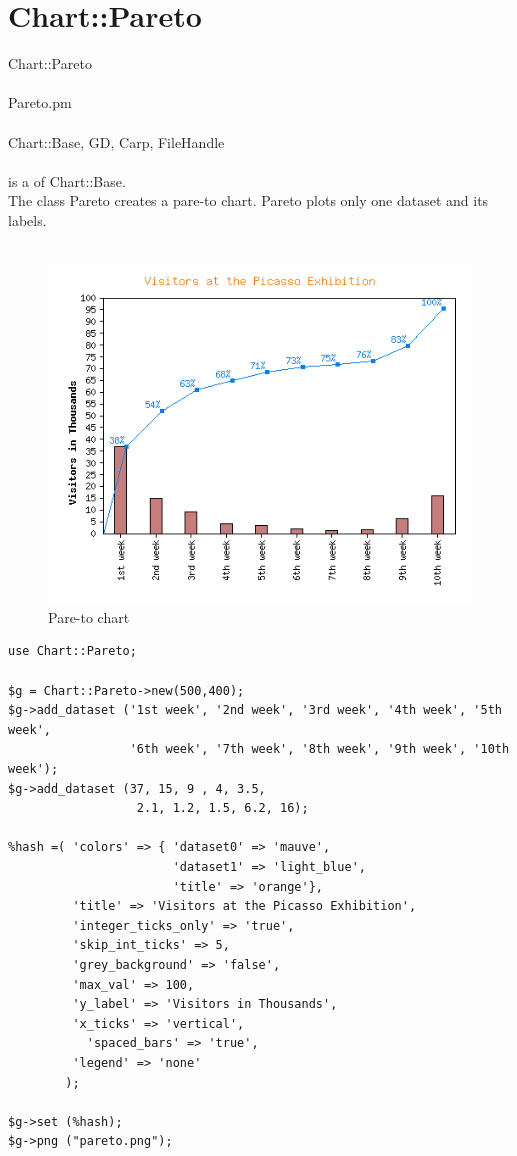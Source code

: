 \section{Chart::Pareto}
 Chart::Pareto\\ \\
 Pareto.pm\\ \\
Chart::Base, GD, Carp, FileHandle\\ \\
  is a  of Chart::Base.\\
The class Pareto creates a pare-to chart. Pareto plots only one dataset and its labels.\\
\\
\begin{figure}[h]
	\begin{center}
		\includegraphics[scale=0.7]{d_pareto2.png}
	\end{center}
	\caption{Pare-to chart}
	\label{fig:pareto}
\end{figure}
\begin{verbatim}
use Chart::Pareto;

$g = Chart::Pareto->new(500,400);
$g->add_dataset ('1st week', '2nd week', '3rd week', '4th week', '5th week',
                 '6th week', '7th week', '8th week', '9th week', '10th week');
$g->add_dataset (37, 15, 9 , 4, 3.5,
                  2.1, 1.2, 1.5, 6.2, 16);

%hash =( 'colors' => { 'dataset0' => 'mauve',
                       'dataset1' => 'light_blue',
                       'title' => 'orange'},
         'title' => 'Visitors at the Picasso Exhibition',
         'integer_ticks_only' => 'true',
         'skip_int_ticks' => 5,
         'grey_background' => 'false',
         'max_val' => 100,
         'y_label' => 'Visitors in Thousands',
         'x_ticks' => 'vertical',
 	       'spaced_bars' => 'true',
         'legend' => 'none'
        );
	
$g->set (%hash); 
$g->png ("pareto.png");
\end{verbatim}
